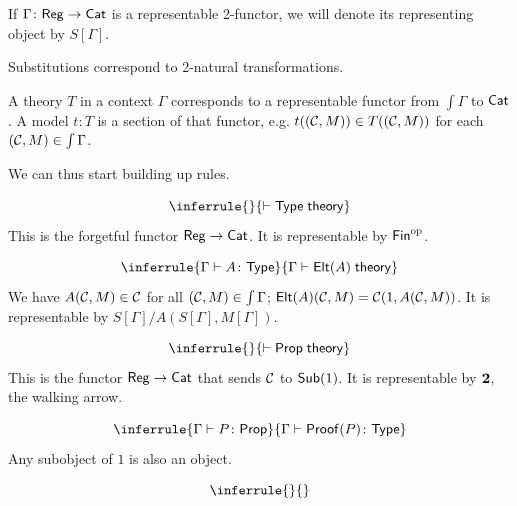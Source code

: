 \documentclass{acmart}
\begin{document}
If $\Gamma \colon \mathsf{Reg} \to \mathsf{Cat}$ is a representable 2-functor, we will denote its representing object by $S[\Gamma]$.

Substitutions correspond to 2-natural transformations.

A theory $T$ in a context $\Gamma$ corresponds to a representable functor from $\int \Gamma$ to $\mathsf{Cat}$. A model $t \colon T$ is a section of that functor, e.g. $t((\mathcal{C},M)) \in T((\mathcal{C},M))$ for each $(\mathcal{C},M) \in \int \Gamma$.

We can thus start building up rules.

\begin{ttrule}
\[\inferrule{}{\yields \ms{Type} \jdg{theory}}\]
This is the forgetful functor $\mathsf{Reg} \to \mathsf{Cat}$. It is representable by $\mathsf{Fin}^\mathrm{op}$.
\end{ttrule}

\begin{ttrule}
\[\inferrule{\Gamma \yields A \colon \ms{Type}}{\Gamma \yields \ms{Elt}(A) \jdg{theory}}\]
We have $A(\mathcal{C},M) \in \mathcal{C}$ for all $(\mathcal{C},M) \in \int \Gamma$; $\mathsf{Elt}(A)(\mathcal{C},M) = \mathcal{C}(1, A(\mathcal{C},M))$. It is representable by $S[\Gamma]/A(S[\Gamma], M[\Gamma])$.
\end{ttrule}

\begin{ttrule}
\[\inferrule{}{\yields \ms{Prop} \jdg{theory}}\]
This is the functor $\mathsf{Reg} \to \mathsf{Cat}$ that sends $\mathcal{C}$ to $\mathsf{Sub}(1)$. It is representable by $\mathbf{2}$, the walking arrow.
\end{ttrule}

\begin{ttrule}
  \[\inferrule{\Gamma \yields P \colon \ms{Prop}}{\Gamma \yields \ms{Proof}(P) \colon \ms{Type}}\]
  Any subobject of $1$ is also an object.
\end{ttrule}

\begin{ttrule}
\[\inferrule{}{}\]
\end{ttrule}
\end{document}
